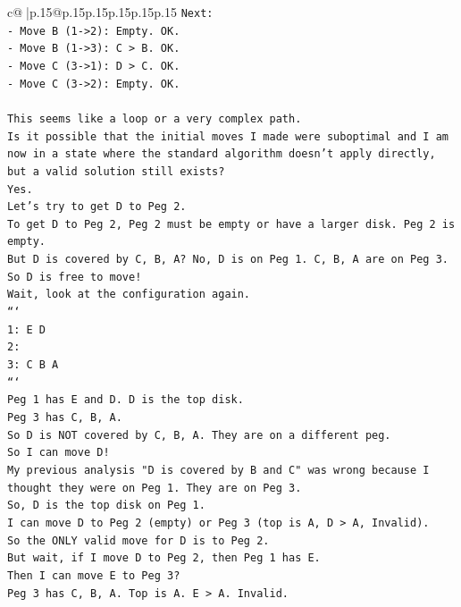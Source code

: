 \documentclass{article}
\begin{document}
{\begin{supertabular}{c@{$\;$}|p{.15\linewidth}@{}p{.15\linewidth}p{.15\linewidth}p{.15\linewidth}p{.15\linewidth}p{.15\linewidth}}
{{{\texttt{Next:} \\
\texttt{{-} Move B (1{-}>2): Empty. OK.} \\
\texttt{{-} Move B (1{-}>3): C > B. OK.} \\
\texttt{{-} Move C (3{-}>1): D > C. OK.} \\
\texttt{{-} Move C (3{-}>2): Empty. OK.} \\
\\ 
\texttt{This seems like a loop or a very complex path.} \\
\texttt{Is it possible that the initial moves I made were suboptimal and I am now in a state where the standard algorithm doesn't apply directly, but a valid solution still exists?} \\
\texttt{Yes.} \\
\texttt{Let's try to get D to Peg 2.} \\
\texttt{To get D to Peg 2, Peg 2 must be empty or have a larger disk. Peg 2 is empty.} \\
\texttt{But D is covered by C, B, A? No, D is on Peg 1. C, B, A are on Peg 3.} \\
\texttt{So D is free to move!} \\
\texttt{Wait, look at the configuration again.} \\
\texttt{```} \\
\texttt{1: E D } \\
\texttt{2: } \\
\texttt{3: C B A } \\
\texttt{```} \\
\texttt{Peg 1 has E and D. D is the top disk.} \\
\texttt{Peg 3 has C, B, A.} \\
\texttt{So D is NOT covered by C, B, A. They are on a different peg.} \\
\texttt{So I can move D!} \\
\texttt{My previous analysis "D is covered by B and C" was wrong because I thought they were on Peg 1. They are on Peg 3.} \\
\texttt{So, D is the top disk on Peg 1.} \\
\texttt{I can move D to Peg 2 (empty) or Peg 3 (top is A, D > A, Invalid).} \\
\texttt{So the ONLY valid move for D is to Peg 2.} \\
\texttt{But wait, if I move D to Peg 2, then Peg 1 has E.} \\
\texttt{Then I can move E to Peg 3?} \\
\texttt{Peg 3 has C, B, A. Top is A. E > A. Invalid.} \\
}}}
\end{supertabular}}
\end{document}
